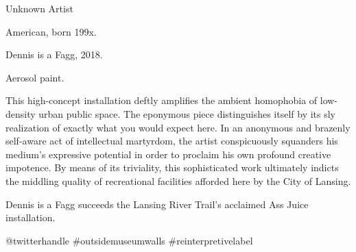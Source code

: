 \documentclass[varwidth=5in, border={20pt 20pt 20pt 20pt}]{standalone}
\begin{document}
\raggedright

{\huge\myboldfont Unknown Artist}

American, born 199x.

\medskip

{\large{\myboldfont Dennis is a Fagg}, 2018.}

Aerosol paint.

\bigskip

This high-concept installation deftly amplifies the ambient homophobia of low-density urban public space.
The eponymous piece distinguishes itself by its sly realization of exactly what you would expect here.
In an anonymous and brazenly self-aware act of intellectual martyrdom, the artist conspicuously squanders his medium's expressive potential in order to proclaim his own profound creative impotence.
By means of its triviality, this sophisticated work ultimately indicts the middling quality of recreational facilities afforded here by the City of Lansing.

\medskip

{\myitalicfont Dennis is a Fagg} succeeds the Lansing River Trail's acclaimed {\myitalicfont Ass Juice} installation.

\bigskip

{\myboldfont @twitterhandle} \hfill {\myitalicfont \#outsidemuseumwalls \#reinterpretivelabel}
\end{document}
